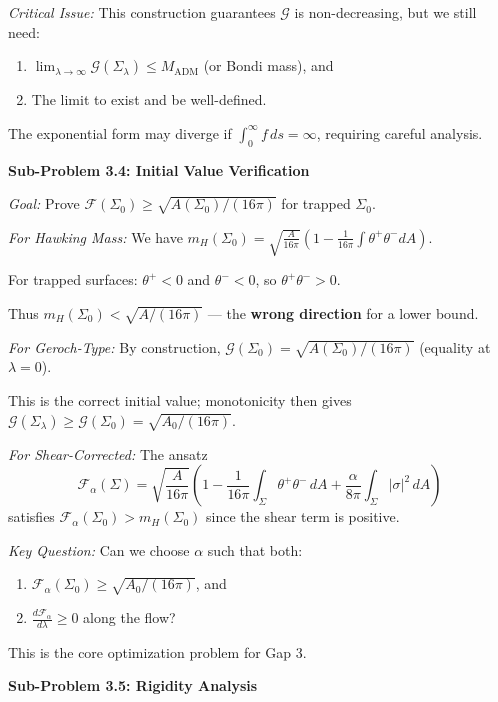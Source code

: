 \textit{Critical Issue:} This construction guarantees $\mathcal{G}$ is non-decreasing, but we still need:
\begin{enumerate}
    \item $\lim_{\lambda \to \infty} \mathcal{G}(\Sigma_\lambda) \leq M_{\mathrm{ADM}}$ (or Bondi mass), and
    \item The limit to exist and be well-defined.
\end{enumerate}
The exponential form may diverge if $\int_0^\infty f \, ds = \infty$, requiring careful analysis.

\textbf{Sub-Problem 3.4: Initial Value Verification}

\textit{Goal:} Prove $\mathcal{F}(\Sigma_0) \geq \sqrt{A(\Sigma_0)/(16\pi)}$ for trapped $\Sigma_0$.

\textit{For Hawking Mass:} We have $m_H(\Sigma_0) = \sqrt{\frac{A}{16\pi}}(1 - \frac{1}{16\pi}\int\theta^+\theta^- dA)$.

For trapped surfaces: $\theta^+ < 0$ and $\theta^- < 0$, so $\theta^+\theta^- > 0$.

Thus $m_H(\Sigma_0) < \sqrt{A/(16\pi)}$ --- the \textbf{wrong direction} for a lower bound.

\textit{For Geroch-Type:} By construction, $\mathcal{G}(\Sigma_0) = \sqrt{A(\Sigma_0)/(16\pi)}$ (equality at $\lambda = 0$).

This is the correct initial value; monotonicity then gives $\mathcal{G}(\Sigma_\lambda) \geq \mathcal{G}(\Sigma_0) = \sqrt{A_0/(16\pi)}$.

\textit{For Shear-Corrected:} The ansatz
\begin{equation}
    \mathcal{F}_\alpha(\Sigma) = \sqrt{\frac{A}{16\pi}}\left(1 - \frac{1}{16\pi}\int_\Sigma \theta^+\theta^- \, dA + \frac{\alpha}{8\pi}\int_\Sigma |\sigma|^2 \, dA\right)
\end{equation}
satisfies $\mathcal{F}_\alpha(\Sigma_0) > m_H(\Sigma_0)$ since the shear term is positive.

\textit{Key Question:} Can we choose $\alpha$ such that both:
\begin{enumerate}
    \item $\mathcal{F}_\alpha(\Sigma_0) \geq \sqrt{A_0/(16\pi)}$, and
    \item $\frac{d\mathcal{F}_\alpha}{d\lambda} \geq 0$ along the flow?
\end{enumerate}
This is the core optimization problem for Gap 3.

\textbf{Sub-Problem 3.5: Rigidity Analysis}

